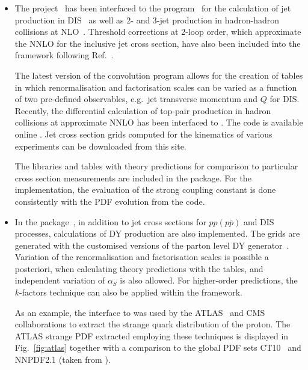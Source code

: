 \begin{itemize}
  \item The \fastnlo project~\cite{Kluge:2006xs} has been interfaced
    to the \nlojetpp program~\cite{Nagy:1998bb} for the calculation of
    jet production in DIS~\cite{Nagy:2001xb} as well as 2- and 3-jet
    production in hadron-hadron collisions at
    NLO~\cite{Nagy:2003tz,Nagy:2001fj}.  Threshold corrections at 2-loop
    order, which approximate the NNLO for the inclusive jet cross
    section, have also been included into the framework \cite{Wobisch:2011ij} 
    following Ref.~\cite{Kidonakis:2000gi}.
  
    The latest version of the \fastnlo convolution program \cite{Britzger:2012bs} allows for the
    creation of tables in which renormalisation and factorisation scales
    can be varied as a function of two pre-defined observables, e.g.\ jet
    transverse momentum \pperp and $Q$ for DIS\@. 
    Recently, the differential calculation of top-pair production in hadron collisions 
    at approximate NNLO \cite{Guzzi:2014wia} has been interfaced to \fastnlo \cite{dis2014Fast}.
    The \fastnlo code is available online \cite{fastNLO:HepForge}.
    Jet cross section grids computed for the kinematics of various experiments
    can be downloaded from this site.

    The \fastnlo libraries and tables with theory predictions  for comparison to
    particular cross section measurements are included in the \fitter package. 
    For the \fitter implementation, the evaluation of the strong coupling constant is done
    consistently with the PDF evolution from the \qcdnum code. 
\\
\item In the \applgrid package~\cite{Carli:2010rw,APPLGRID:HepForge},
    in addition to jet cross sections for
    $pp(p\bar p)$ and DIS processes, calculations 
    of DY production are also implemented. The grids are generated with
    the customised versions of the \mcfm parton level DY
    generator~\cite{Campbell:1999ah,Campbell:2000je,Campbell:2010ff}.
    Variation of the renormalisation and factorisation scales is possible a posteriori,
    when calculating theory predictions with the \applgrid  tables, and
    independent variation of $\alpha_S$ is also allowed.
    For higher-order predictions, the $k$-factors technique can also be applied
    within the \applgrid framework.

    As an example, the \fitter interface to \applgrid was used by the ATLAS~\cite{atlas:strange}
    and CMS~\cite{cms:strange} collaborations to extract the strange quark distribution of the proton.
    The ATLAS strange PDF extracted employing these techniques is displayed in
    Fig.~\ref{fig:atlas} together with a comparison to the global PDF
    sets CT10~\cite{CT10pdf} and NNPDF2.1 \cite{NNPDFpdf} (taken from \cite{atlas:strange}).


\end{itemize}
